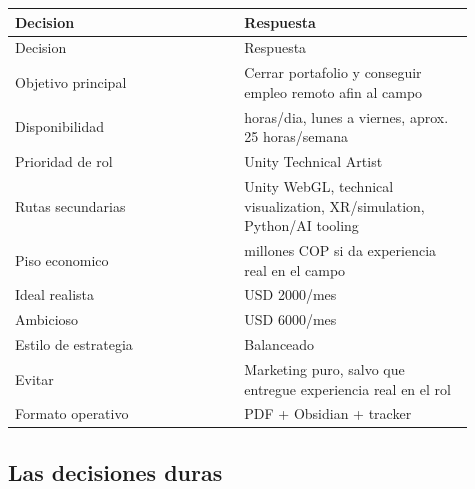 \begin{center}
\scriptsize
\begin{longtable}{>{\raggedright\arraybackslash}p{0.455\linewidth} >{\raggedright\arraybackslash}p{0.455\linewidth}}
\toprule
Decision & Respuesta \\
\midrule
\endfirsthead
\toprule
Decision & Respuesta \\
\midrule
\endhead
Objetivo principal & Cerrar portafolio y conseguir empleo remoto afin al campo \\
Disponibilidad & 5 horas/dia, lunes a viernes, aprox. 25 horas/semana \\
Prioridad de rol & Unity Technical Artist \\
Rutas secundarias & Unity WebGL, technical visualization, XR/simulation, Python/AI tooling \\
Piso economico & 3 millones COP si da experiencia real en el campo \\
Ideal realista & USD 2000/mes \\
Ambicioso & USD 6000/mes \\
Estilo de estrategia & Balanceado \\
Evitar & Marketing puro, salvo que entregue experiencia real en el rol \\
Formato operativo & PDF + Obsidian + tracker \\
\bottomrule
\end{longtable}
\end{center}


\subsection{Las decisiones duras}


